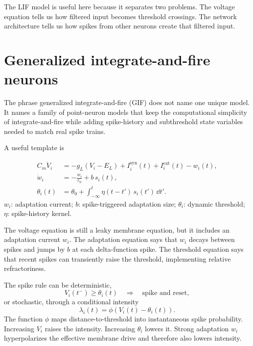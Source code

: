 The LIF model is useful here because it separates two problems. The voltage equation tells us how filtered input becomes threshold crossings. The network architecture tells us how spikes from other neurons create that filtered input.

\section{Generalized integrate-and-fire neurons}
\label{sec:gif-neurons}

The phrase generalized integrate-and-fire (GIF) does not name one unique model. It names a family of point-neuron models that keep the computational simplicity of integrate-and-fire while adding spike-history and subthreshold state variables needed to match real spike trains.

A useful template is
%
\begin{keyequation}
\begin{align}
  C_m\dot V_i
  &=
  -g_L(V_i-E_L)
  + I_i^{\mathrm{syn}}(t)
  + I_i^{\mathrm{ext}}(t)
  - w_i(t),
  \label{eq:gif-voltage}
  \\
  \dot w_i
  &=
  -\frac{w_i}{\tau_w}
  +
  b\,s_i(t),
  \label{eq:gif-adaptation}
  \\
  \theta_i(t)
  &=
  \theta_0
  +
  \int_{-\infty}^{t}\eta(t-t')\,s_i(t')\,\dd t' .
  \label{eq:gif-threshold}
\end{align}
\tcblower
$w_i$: adaptation current; $b$: spike-triggered adaptation size; $\theta_i$: dynamic threshold; $\eta$: spike-history kernel.
\end{keyequation}

\noindent The voltage equation is still a leaky membrane equation, but it includes an adaptation current $w_i$. The adaptation equation says that $w_i$ decays between spikes and jumps by $b$ at each delta-function spike. The threshold equation says that recent spikes can transiently raise the threshold, implementing relative refractoriness.

The spike rule can be deterministic,
%
\begin{equation}
  V_i(t^-)\geq \theta_i(t)
  \quad\Rightarrow\quad
  \text{spike and reset},
  \label{eq:gif-deterministic-rule}
\end{equation}
%
or stochastic, through a conditional intensity
%
\begin{equation}
  \lambda_i(t)
  =
  \phi\!\left(V_i(t)-\theta_i(t)\right).
  \label{eq:gif-intensity}
\end{equation}
%
The function $\phi$ maps distance-to-threshold into instantaneous spike probability. Increasing $V_i$ raises the intensity. Increasing $\theta_i$ lowers it. Strong adaptation $w_i$ hyperpolarizes the effective membrane drive and therefore also lowers intensity.

